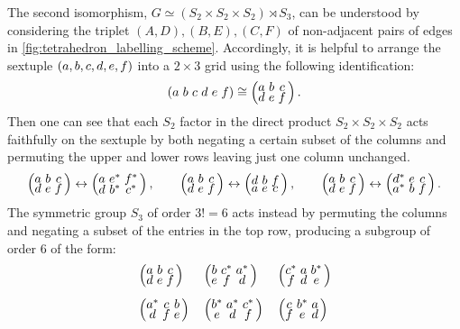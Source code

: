 \documentclass[notitlepage, 10pt]{article}
\begin{document}
The second isomorphism, $G \simeq (S_2 \times S_2 \times S_2) \rtimes S_3$, can be understood by considering the triplet $(A,D), (B,E), (C,F)$ of non-adjacent pairs of edges in \cref{fig:tetrahedron_labelling_scheme}.
Accordingly, it is helpful to arrange the sextuple $(a,b,c,d,e,f)$ into a $2\times 3$ grid using the following identification:
\begin{equation}
    \left(\tightsextuple{\ea & \eb & \ec & \ed & \ee & \ef}\right)
    \cong 
    \left(\tightsextuple{\ea & \eb & \ec \\ \ed & \ee & \ef}\right).
\end{equation}
Then one can see that each $S_2$ factor in the direct product $S_2 \times S_2 \times S_2$ acts faithfully on the sextuple by both negating a certain subset of the columns and permuting the upper and lower rows leaving just one column unchanged.
\begin{equation}
    \left(\tightsextuple{\ea & \eb & \ec \\ \ed & \ee & \ef}\right)
    \leftrightarrow
    \left(\tightsextuple{\ea & \ee^* & \ef^* \\ \ed & \eb^* & \ec^*}\right),
    \qquad
    \left(\tightsextuple{\ea & \eb & \ec \\ \ed & \ee & \ef}\right)
    \leftrightarrow
    \left(\tightsextuple{\ed & \eb & \ef \\ \ea & \ee & \ec}\right),
    \qquad
    \left(\tightsextuple{\ea & \eb & \ec \\ \ed & \ee & \ef}\right)
    \leftrightarrow
    \left(\tightsextuple{\ed^* & \ee & \ec \\ \ea^* & \eb & \ef}\right).
\end{equation}
The symmetric group $S_3$ of order $3! = 6$ acts instead by permuting the columns and negating a subset of the entries in the top row, producing a subgroup of order $6$ of the form:
\begin{equation}
    \begin{alignedat}{3}
        &\left(\tightsextuple{\ea & \eb & \ec \\ \ed & \ee & \ef}\right)
        \quad
        &&\left(\tightsextuple{\eb & \ec^* & \ea^* \\ \ee & \ef & \ed}\right)
        \quad
        &&\left(\tightsextuple{\ec^* & \ea & \eb^*  \\ \ef & \ed & \ee }\right)\\[0.5em]
        &\left(\tightsextuple{\ea^* & \ec & \eb \\ \ed & \ef & \ee}\right)
        \quad
        &&\left(\tightsextuple{\eb^* & \ea^*  & \ec^* \\ \ee & \ed & \ef}\right)
        \quad
        &&\left(\tightsextuple{\ec & \eb^* & \ea \\ \ef & \ee & \ed}\right)\\
    \end{alignedat}
\end{equation}
\end{document}
